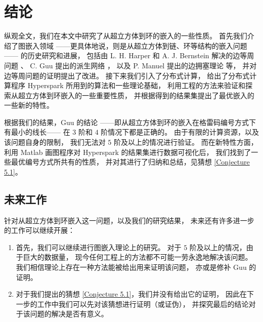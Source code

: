 
\chapter{结论}
\label{Chapter 6}

纵观全文，我们在本文中研究了从超立方体到环的嵌入的一些性质。
首先我们介绍了图嵌入领域
——更具体地说，则是从超立方体到链、环等结构的嵌入问题——
的历史研究和进展，
包括由 L. H. Harper 和 A. J. Bernstein 解决的边等周问题 \cite{Harper.1964,Bernstein.1967}、
C. Guu 提出的派生网络 \cite{Guu.1997}，
以及 P. Manuel 提出的边拥塞理论 \cite{Manuel.2009} 等，
并对边等周问题的证明提出了改进。
接下来我们引入了分布式计算，
给出了分布式计算程序 Hyperspark 所用到的算法和一些理论基础，
利用工程的方法来验证和探索从超立方体到环嵌入的一些重要性质，
并根据得到的结果集提出了最优嵌入的一些新的特性。

根据我们的结果，Guu 的结论
——即从超立方体到环的嵌入在格雷码编号方式下有最小的线长——
在 $3$ 阶和 $4$ 阶情况下都是正确的。
由于有限的计算资源，以及该问题自身的限制，
我们无法对 $5$ 阶及以上的情况进行验证。
而在新特性方面，利用 Matlab 画图程序对 Hyperspark 的结果集进行数据可视化后，
我们找到了一些最优编号方式所共有的性质，
并对其进行了归纳和总结，见猜想 \ref{Conjecture 5.1}。

\section{未来工作}
\label{Section 6.1}

针对从超立方体到环嵌入这一问题，以及我们的研究结果，
未来还有许多进一步的工作可以继续开展：
\begin{enumerate}[(1)]
	\item 首先，我们可以继续进行图嵌入理论上的研究。
		对于 $5$ 阶及以上的情况，由于巨大的数据量，
		现今任何工程上的方法都不可能一劳永逸地解决该问题。
		我们相信理论上存在一种方法能被给出用来证明该问题，
		亦或是修补 Guu 的证明。
	\item 对于我们提出的猜想 \ref{Conjecture 5.1}，我们并没有给出它的证明，
		因此在下一步的工作中我们可以先对该猜想进行证明（或证伪），
		并探究最后的结论对于该问题的解决是否有意义。
\end{enumerate}
